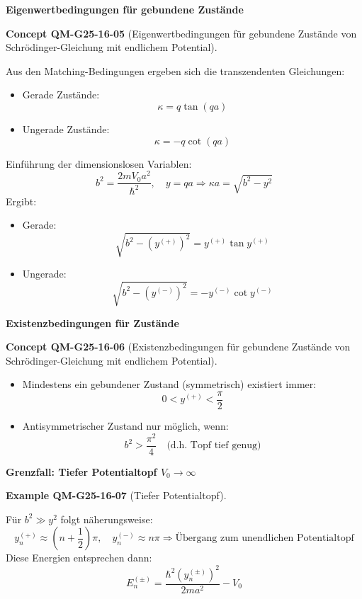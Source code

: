 \documentclass[10pt, letterpaper]{article}
\newcommand{\CustomHeading}[3]{%
  \par\medskip\noindent%
  \textbf{#1 #2} \textnormal{(#3)}.\enskip%
}
\newenvironment{EXA}[2]{\begin{unitbox}\CustomHeading{Example}{#1}{#2}}{\end{unitbox}}
\newenvironment{CONC}[2]{\begin{unitbox}\CustomHeading{Concept}{#1}{#2}}{\end{unitbox}}
\begin{document}
\textbf{Eigenwertbedingungen für gebundene Zustände}

\begin{CONC}{QM-G25-16-05}{Eigenwertbedingungen für gebundene Zustände von Schrödinger-Gleichung mit endlichem Potential}
Aus den Matching-Bedingungen ergeben sich die transzendenten Gleichungen:
\begin{itemize}
\item Gerade Zustände:
  \[
  \kappa = q \tan(qa)
  \]
\item Ungerade Zustände:
  \[
  \kappa = -q \cot(qa)
  \]
\end{itemize}
Einführung der dimensionslosen Variablen:
\[
b^2 = \frac{2m V_0 a^2}{\hbar^2}, \quad y = qa
\Rightarrow \kappa a = \sqrt{b^2 - y^2}
\]
Ergibt:
\begin{itemize}
\item Gerade:
  \[
  \sqrt{b^2 - (y^{(+)})^2} = y^{(+)} \tan y^{(+)}
  \]
\item Ungerade:
  \[
  \sqrt{b^2 - (y^{(-)})^2} = - y^{(-)} \cot y^{(-)}
  \]
\end{itemize}
\end{CONC}


\textbf{Existenzbedingungen für Zustände}

\begin{CONC}{QM-G25-16-06}{Existenzbedingungen für gebundene Zustände von Schrödinger-Gleichung mit endlichem Potential}
\begin{itemize}
\item Mindestens ein gebundener Zustand (symmetrisch) existiert immer:
  \[
  0 < y^{(+)} < \frac{\pi}{2}
  \]
\item Antisymmetrischer Zustand nur möglich, wenn:
  \[
  b^2 > \frac{\pi^2}{4}
  \quad \text{(d.h. Topf tief genug)}
  \]
\end{itemize}
\end{CONC}



\textbf{Grenzfall: Tiefer Potentialtopf $V_0 \rightarrow \infty$}


\begin{EXA}{QM-G25-16-07}{Tiefer Potentialtopf}
Für \( b^2 \gg y^2 \) folgt näherungsweise:
\[
y_n^{(+)} \approx \left(n + \frac{1}{2}\right)\pi, \quad
y_n^{(-)} \approx n \pi
\Rightarrow \text{Übergang zum unendlichen Potentialtopf}
\]
Diese Energien entsprechen dann:
\[
E_n^{(\pm)} = \frac{\hbar^2 (y_n^{(\pm)})^2}{2ma^2} - V_0
\]
\end{EXA}
\end{document}
